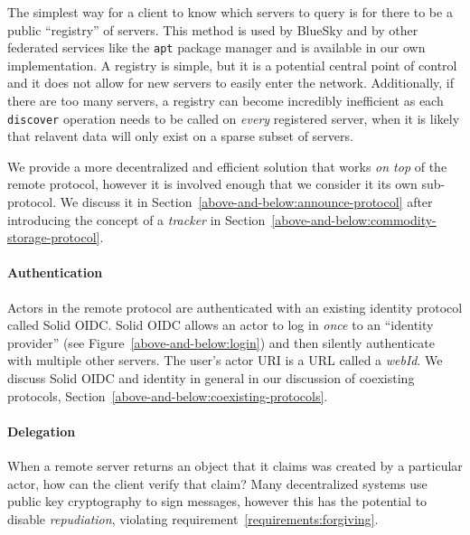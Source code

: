 The simplest way for a client to know which
servers to query is for there to
be a public ``registry'' of servers.
This method is used by BlueSky and by other federated services like
the \texttt{apt} package manager
and is available in our
own implementation.
A registry is simple, but it is a potential central point of control
and it does not allow for new
servers to easily enter the network.
Additionally, if there are too many servers, a registry can become
incredibly inefficient as each \texttt{discover} operation needs to be called
on \emph{every} registered server, when it is likely that relavent data
will only exist on a sparse subset of servers.

We provide a more decentralized and efficient
solution that works \emph{on top} of the remote protocol,
however it is involved enough that we consider it its own sub-protocol.
We discuss it in Section~\ref{above-and-below:announce-protocol} after introducing the concept
of a \emph{tracker}
in Section~\ref{above-and-below:commodity-storage-protocol}.

\paragraph{Authentication}
Actors in the remote protocol are authenticated with an existing
identity protocol called Solid OIDC.
Solid OIDC allows an actor to log in \emph{once} to an
``identity provider'' (see Figure~\ref{above-and-below:login})
and then silently authenticate with multiple
other servers.
The user's actor URI is a URL called a \emph{webId}.
We discuss Solid OIDC and identity in general in our discussion of
coexisting protocols, Section~\ref{above-and-below:coexisting-protocols}.

\paragraph{Delegation}
\label{above-and-below:delegation}

When a remote server returns an object that it claims
was created by a particular actor, how can the client verify that claim?
Many decentralized systems use public key cryptography to sign messages,
however this has the potential to disable \emph{repudiation},
violating requirement~\ref{requirements:forgiving}.

